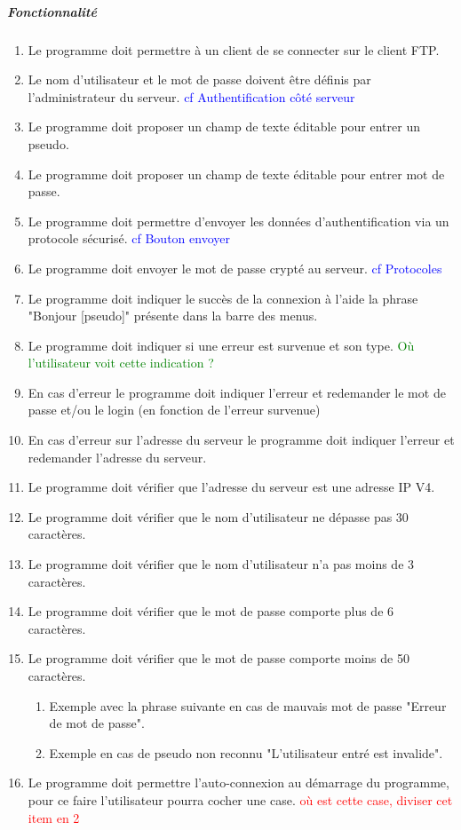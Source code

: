 \documentclass[10pt,a4paper]{report}
\begin{document}
	\subparagraph{Fonctionnalité}
	\begin{enumerate}
		\item Le programme doit permettre à un client de se connecter sur le client FTP.
		\item Le nom d'utilisateur et le mot de passe doivent être définis par l'administrateur du serveur. \textcolor{blue}{cf Authentification côté serveur}
		\item Le programme doit proposer un champ de texte éditable pour entrer un pseudo.
		\item Le programme doit proposer un champ de texte éditable pour entrer mot de passe.
		\item Le programme doit permettre d'envoyer les données d'authentification via un protocole sécurisé. \textcolor{blue}{cf Bouton envoyer}
		\item Le programme doit envoyer le mot de passe crypté au serveur. \textcolor{blue}{cf Protocoles}
		\item Le programme doit indiquer le succès de la connexion à l'aide la phrase "Bonjour [pseudo]" présente dans la barre des menus.
		\item Le programme doit indiquer si une erreur est survenue et son type. \textcolor{green}{Où l'utilisateur voit cette indication ?}
		\item En cas d'erreur le programme doit indiquer l'erreur et redemander le mot de passe et/ou le login (en fonction de l'erreur survenue)
		\item En cas d'erreur sur l'adresse du serveur le programme doit indiquer l'erreur et redemander l'adresse du serveur.
		\item Le programme doit vérifier que l'adresse du serveur est une adresse IP V4.
		\item Le programme doit vérifier que le nom d'utilisateur ne dépasse pas 30 caractères.
		\item Le programme doit vérifier que le nom d'utilisateur n'a pas moins de 3 caractères.
		\item Le programme doit vérifier que le mot de passe comporte plus de 6 caractères.
		\item Le programme doit vérifier que le mot de passe comporte moins de 50 caractères.
		\begin{enumerate}
			\item Exemple avec la phrase suivante en cas de mauvais mot de passe "Erreur de mot de passe".
			\item Exemple en cas de pseudo non reconnu "L'utilisateur entré est invalide".
		\end{enumerate}
		\item Le programme doit permettre l'auto-connexion au démarrage du programme, pour ce faire l'utilisateur pourra cocher une case. \textcolor{red}{où est cette case, diviser cet item en 2}
	\end{enumerate}
\end{document}
